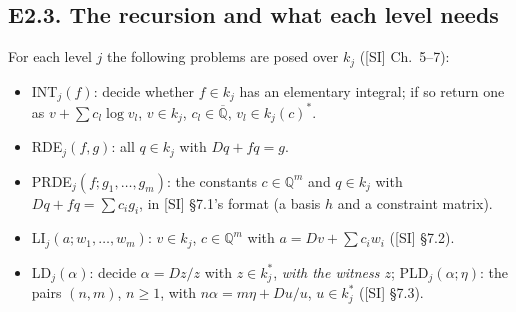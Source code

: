 \documentclass[11pt]{article}
\theoremstyle{definition}
\theoremstyle{remark}
\newcommand{\Q}{\mathbb{Q}}
\newcommand{\Qbar}{\overline{\mathbb{Q}}}
\begin{document}
\subsection*{E2.3. The recursion and what each level needs}

For each level $j$ the following problems are posed over $k_j$ ([SI] Ch.~5--7):
\begin{itemize}
\item INT$_j(f)$: decide whether $f\in k_j$ has an elementary integral; if so return one
  as $v+\sum c_l\log v_l$, $v\in k_j$, $c_l\in\Qbar$, $v_l\in k_j(c)^*$.
\item RDE$_j(f,g)$: all $q\in k_j$ with $Dq+fq=g$.
\item PRDE$_j(f;g_1,\dots,g_m)$: the constants $c\in\Q^m$ and $q\in k_j$ with
  $Dq+fq=\sum c_ig_i$, in [SI] \S7.1's format (a basis $h$ and a constraint matrix).
\item LI$_j(a;w_1,\dots,w_m)$: $v\in k_j$, $c\in\Q^m$ with $a=Dv+\sum c_iw_i$ ([SI] \S7.2).
\item LD$_j(\alpha)$: decide $\alpha=Dz/z$ with $z\in k_j^*$, \emph{with the witness $z$};
  PLD$_j(\alpha;\eta)$: the pairs $(n,m)$, $n\ge1$, with $n\alpha=m\eta+Du/u$, $u\in k_j^*$
  ([SI] \S7.3).
\end{itemize}
\end{document}
